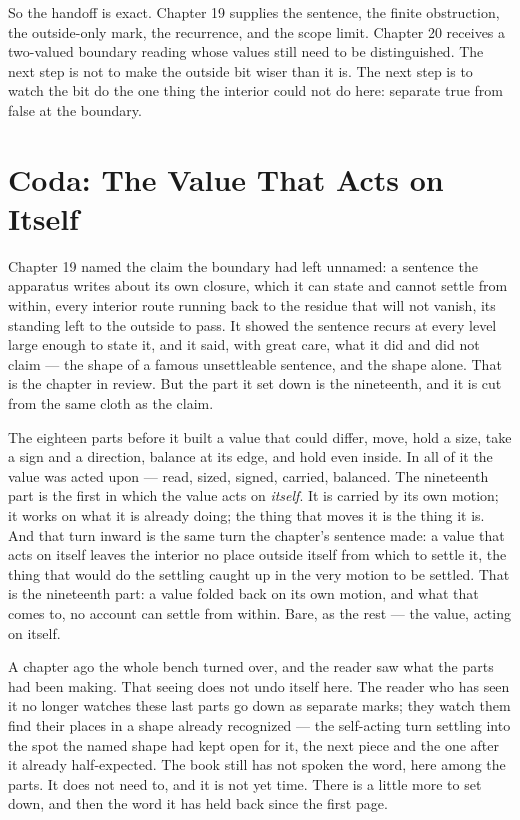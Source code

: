 So the handoff is exact. Chapter 19 supplies the sentence, the finite obstruction, the
outside-only mark, the recurrence, and the scope limit. Chapter 20 receives a two-valued
boundary reading whose values still need to be distinguished. The next step is not to make the
outside bit wiser than it is. The next step is to watch the bit do the one thing the interior
could not do here: separate true from false at the boundary.

\section*{Coda: The Value That Acts on Itself}

Chapter 19 named the claim the boundary had left unnamed: a sentence the apparatus writes about its own closure, which it can state and cannot settle from within, every interior route running back to the residue that will not vanish, its standing left to the outside to pass. It showed the sentence recurs at every level large enough to state it, and it said, with great care, what it did and did not claim --- the shape of a famous unsettleable sentence, and the shape alone. That is the chapter in review. But the part it set down is the nineteenth, and it is cut from the same cloth as the claim.

The eighteen parts before it built a value that could differ, move, hold a size, take a sign and a direction, balance at its edge, and hold even inside. In all of it the value was acted upon --- read, sized, signed, carried, balanced. The nineteenth part is the first in which the value acts on \emph{itself}. It is carried by its own motion; it works on what it is already doing; the thing that moves it is the thing it is. And that turn inward is the same turn the chapter's sentence made: a value that acts on itself leaves the interior no place outside itself from which to settle it, the thing that would do the settling caught up in the very motion to be settled. That is the nineteenth part: a value folded back on its own motion, and what that comes to, no account can settle from within. Bare, as the rest --- the value, acting on itself.

A chapter ago the whole bench turned over, and the reader saw what the parts had been making. That seeing does not undo itself here. The reader who has seen it no longer watches these last parts go down as separate marks; they watch them find their places in a shape already recognized --- the self-acting turn settling into the spot the named shape had kept open for it, the next piece and the one after it already half-expected. The book still has not spoken the word, here among the parts. It does not need to, and it is not yet time. There is a little more to set down, and then the word it has held back since the first page.

